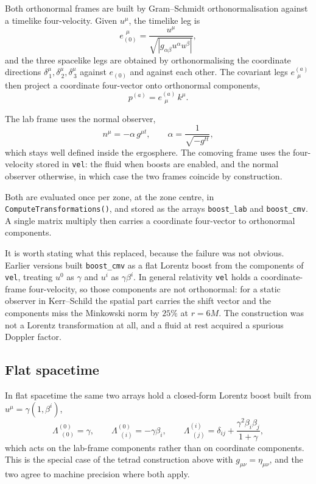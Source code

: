 \documentclass[11pt]{article}
\begin{document}
Both orthonormal frames are built by Gram--Schmidt orthonormalisation against a timelike
four-velocity. Given $u^\mu$, the timelike leg is
\begin{equation}
  e_{(0)}^{\ \ \mu} = \frac{u^\mu}{\sqrt{\left| g_{\alpha\beta} u^\alpha u^\beta \right|}} ,
\end{equation}
and the three spacelike legs are obtained by orthonormalising the coordinate directions
$\delta^\mu_{\ 1}, \delta^\mu_{\ 2}, \delta^\mu_{\ 3}$ against $e_{(0)}$ and against each
other. The covariant legs $e^{(a)}_{\ \ \mu}$ then project a coordinate four-vector onto
orthonormal components,
\begin{equation}
  p^{(a)} = e^{(a)}_{\ \ \mu} \, k^\mu .
  \label{eq:project}
\end{equation}

The lab frame uses the normal observer,
\begin{equation}
  n^\mu = -\alpha \, g^{\mu t} , \qquad \alpha = \frac{1}{\sqrt{-g^{tt}}} ,
\end{equation}
which stays well defined inside the ergosphere. The comoving frame uses the four-velocity
stored in \texttt{vel}: the fluid when boosts are enabled, and the normal observer
otherwise, in which case the two frames coincide by construction.

Both are evaluated once per zone, at the zone centre, in
\texttt{ComputeTransformations()}, and stored as the arrays \texttt{boost\_lab} and
\texttt{boost\_cmv}. A single matrix multiply then carries a coordinate four-vector to
orthonormal components.

It is worth stating what this replaced, because the failure was not obvious. Earlier
versions built \texttt{boost\_cmv} as a flat Lorentz boost from the components of
\texttt{vel}, treating $u^0$ as $\gamma$ and $u^i$ as $\gamma \beta^i$. In general
relativity \texttt{vel} holds a coordinate-frame four-velocity, so those components are
not orthonormal: for a static observer in Kerr--Schild the spatial part carries the shift
vector and the components miss the Minkowski norm by $25\%$ at $r=6M$. The construction
was not a Lorentz transformation at all, and a fluid at rest acquired a spurious Doppler
factor.

\subsection{Flat spacetime}

In flat spacetime the same two arrays hold a closed-form Lorentz boost built from
$u^\mu = \gamma(1, \beta^i)$,
\begin{equation}
  \Lambda^{(0)}_{\ \ (0)} = \gamma , \qquad
  \Lambda^{(0)}_{\ \ (i)} = -\gamma \beta_i , \qquad
  \Lambda^{(i)}_{\ \ (j)} = \delta_{ij} + \frac{\gamma^2 \beta_i \beta_j}{1+\gamma} ,
\end{equation}
which acts on the lab-frame components rather than on coordinate components. This is the
special case of the tetrad construction above with $g_{\mu\nu} = \eta_{\mu\nu}$, and the
two agree to machine precision where both apply.
\end{document}
